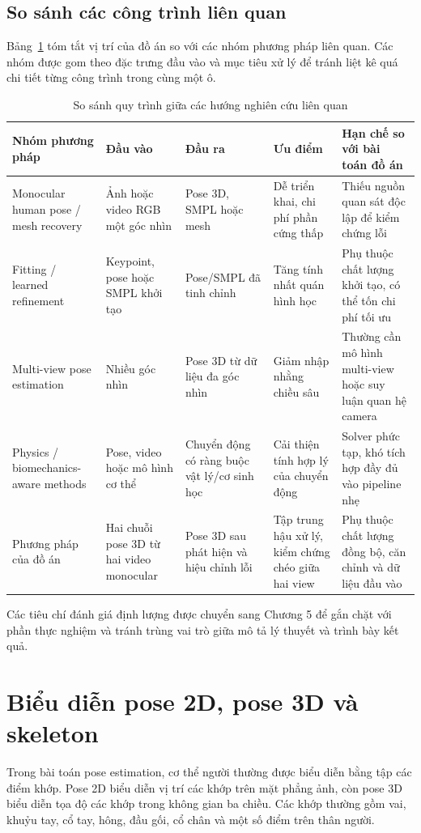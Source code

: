\documentclass[../DoAn.tex]{subfiles}
\begin{document}
\subsection{So sánh các công trình liên quan}
Bảng~\ref{tab:related_work_process} tóm tắt vị trí của đồ án so với các nhóm phương pháp liên quan. Các nhóm được gom theo đặc trưng đầu vào và mục tiêu xử lý để tránh liệt kê quá chi tiết từng công trình trong cùng một ô.

\begin{table}[H]
\centering
\caption{So sánh quy trình giữa các hướng nghiên cứu liên quan}
\label{tab:related_work_process}
\begin{tabular}{|p{3.0cm}|p{2.9cm}|p{2.9cm}|p{3.1cm}|p{3.2cm}|}
\hline
\textbf{Nhóm phương pháp} & \textbf{Đầu vào} & \textbf{Đầu ra} & \textbf{Ưu điểm} & \textbf{Hạn chế so với bài toán đồ án} \\
\hline
Monocular human pose / mesh recovery & Ảnh hoặc video RGB một góc nhìn & Pose 3D, SMPL hoặc mesh & Dễ triển khai, chi phí phần cứng thấp & Thiếu nguồn quan sát độc lập để kiểm chứng lỗi \\
\hline
Fitting / learned refinement & Keypoint, pose hoặc SMPL khởi tạo & Pose/SMPL đã tinh chỉnh & Tăng tính nhất quán hình học & Phụ thuộc chất lượng khởi tạo, có thể tốn chi phí tối ưu \\
\hline
Multi-view pose estimation & Nhiều góc nhìn & Pose 3D từ dữ liệu đa góc nhìn & Giảm nhập nhằng chiều sâu & Thường cần mô hình multi-view hoặc suy luận quan hệ camera \\
\hline
Physics / biomechanics-aware methods & Pose, video hoặc mô hình cơ thể & Chuyển động có ràng buộc vật lý/cơ sinh học & Cải thiện tính hợp lý của chuyển động & Solver phức tạp, khó tích hợp đầy đủ vào pipeline nhẹ \\
\hline
Phương pháp của đồ án & Hai chuỗi pose 3D từ hai video monocular & Pose 3D sau phát hiện và hiệu chỉnh lỗi & Tập trung hậu xử lý, kiểm chứng chéo giữa hai view & Phụ thuộc chất lượng đồng bộ, căn chỉnh và dữ liệu đầu vào \\
\hline
\end{tabular}
\end{table}

Các tiêu chí đánh giá định lượng được chuyển sang Chương 5 để gắn chặt với phần thực nghiệm và tránh trùng vai trò giữa mô tả lý thuyết và trình bày kết quả.

\section{Biểu diễn pose 2D, pose 3D và skeleton}
\label{sec:theory_pose}
Trong bài toán pose estimation, cơ thể người thường được biểu diễn bằng tập các điểm khớp. Pose 2D biểu diễn vị trí các khớp trên mặt phẳng ảnh, còn pose 3D biểu diễn tọa độ các khớp trong không gian ba chiều. Các khớp thường gồm vai, khuỷu tay, cổ tay, hông, đầu gối, cổ chân và một số điểm trên thân người.
\end{document}
